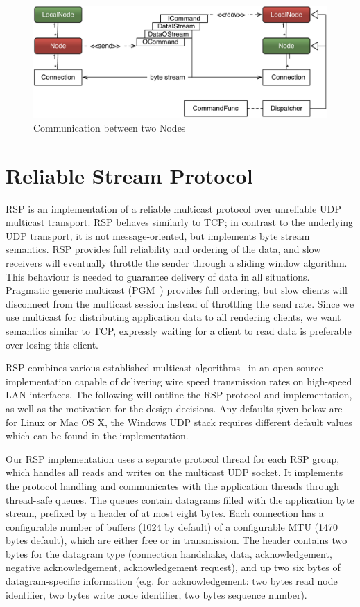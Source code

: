 \begin{figure}[h!t]\center
  \includegraphics[width=\textwidth]{images/netNode.pdf}
  {\caption{\label{fNetNode}Communication between two Nodes}}
\end{figure}

\section{Reliable Stream Protocol}\label{sec:RSP}

RSP is an implementation of a reliable multicast protocol over unreliable UDP
multicast transport. RSP behaves similarly to TCP; in contrast to the underlying
UDP transport, it is not message-oriented, but implements byte stream semantics.
RSP provides full reliability and ordering of the data, and slow receivers will
eventually throttle the sender through a sliding window algorithm. This behaviour
is needed to guarantee delivery of data in all situations. Pragmatic generic
multicast (PGM~\cite{pgm}) provides full ordering, but slow clients will
disconnect from the multicast session instead of throttling the send rate. Since
we use multicast for distributing application data to all rendering clients, we
want semantics similar to TCP, expressly waiting for a client to read data is
preferable over losing this client.

RSP combines various established multicast
algorithms~\cite{adamson2004negative,Gau:2002} in an open source implementation
capable of delivering wire speed transmission rates on high-speed LAN
interfaces. The following will outline the RSP protocol and implementation,
as well as the motivation for the design decisions. Any defaults given below are for Linux
or Mac OS X, the Windows UDP stack requires different default values which can be
found in the implementation.

Our RSP implementation uses a separate protocol thread for each RSP group, which
handles all reads and writes on the multicast UDP socket. It implements the
protocol handling and communicates with the application threads through
thread-safe queues. The queues contain datagrams filled with the application
byte stream, prefixed by a header of at most eight bytes. Each connection has a
configurable number of buffers (1024 by default) of a configurable MTU (1470
bytes default), which are either free or in transmission. The header contains
two bytes for the datagram type (connection handshake, data, acknowledgement,
negative acknowledgement, acknowledgement request), and up two six bytes of
datagram-specific information (e.g. for acknowledgement: two bytes read node
identifier, two bytes write node identifier, two bytes sequence number).


